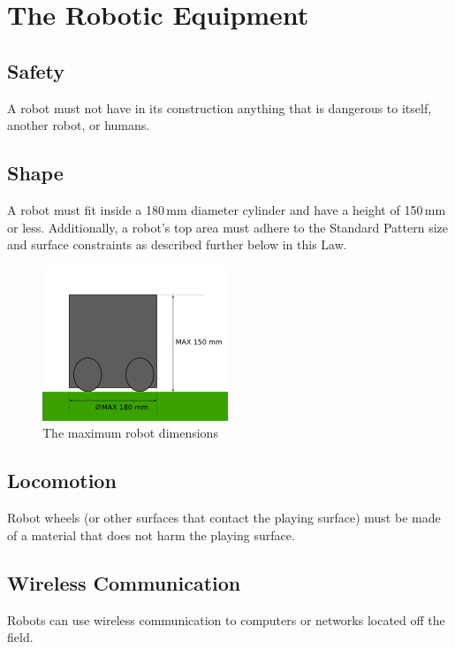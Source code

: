 \section{The Robotic Equipment}\label{sec:robotic-equipment}

\subsection{Safety}
A robot must not have in its construction anything that is dangerous to itself, another robot, or humans.

\subsection{Shape}
A robot must fit inside a 180\,mm diameter cylinder and have a height of 150\,mm or less.
Additionally, a robot's top area must adhere to the Standard Pattern size and surface constraints as described further below in this Law.

\begin{figure}[ht] %
	\centering
	\includegraphics[width=0.5\columnwidth]{img/robot_size.png}
	\caption{The maximum robot dimensions}
	\label{fig:robotdimension}
\end{figure}

\subsection{Locomotion}
Robot wheels (or other surfaces that contact the playing surface) must be made of a material that does not harm the playing surface.

\subsection{Wireless Communication}
Robots can use wireless communication to computers or networks located off the field.

